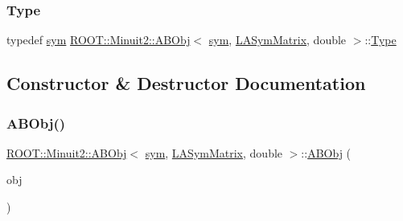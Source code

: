 \mbox{\label{classROOT_1_1Minuit2_1_1ABObj_3_01sym_00_01LASymMatrix_00_01double_01_4_ac7186d69c32b1e8a607ae45125e869c0}} 
\subsubsection{\texorpdfstring{Type}{Type}\hspace{0.1cm}{\footnotesize\ttfamily [2/2]}}
{\footnotesize\ttfamily typedef \mbox{\hyperlink{classROOT_1_1Minuit2_1_1sym}{sym}} \mbox{\hyperlink{classROOT_1_1Minuit2_1_1ABObj}{R\+O\+O\+T\+::\+Minuit2\+::\+A\+B\+Obj}}$<$ \mbox{\hyperlink{classROOT_1_1Minuit2_1_1sym}{sym}}, \mbox{\hyperlink{classROOT_1_1Minuit2_1_1LASymMatrix}{L\+A\+Sym\+Matrix}}, double $>$\+::\mbox{\hyperlink{classROOT_1_1Minuit2_1_1ABObj_3_01sym_00_01LASymMatrix_00_01double_01_4_ac7186d69c32b1e8a607ae45125e869c0}{Type}}}



\subsection{Constructor \& Destructor Documentation}
\mbox{\label{classROOT_1_1Minuit2_1_1ABObj_3_01sym_00_01LASymMatrix_00_01double_01_4_a22738586c6027ada2234556dbab7d406}} 
\subsubsection{\texorpdfstring{ABObj()}{ABObj()}\hspace{0.1cm}{\footnotesize\ttfamily [1/8]}}
{\footnotesize\ttfamily \mbox{\hyperlink{classROOT_1_1Minuit2_1_1ABObj}{R\+O\+O\+T\+::\+Minuit2\+::\+A\+B\+Obj}}$<$ \mbox{\hyperlink{classROOT_1_1Minuit2_1_1sym}{sym}}, \mbox{\hyperlink{classROOT_1_1Minuit2_1_1LASymMatrix}{L\+A\+Sym\+Matrix}}, double $>$\+::\mbox{\hyperlink{classROOT_1_1Minuit2_1_1ABObj}{A\+B\+Obj}} (\begin{DoxyParamCaption}\item[{const \mbox{\hyperlink{classROOT_1_1Minuit2_1_1LASymMatrix}{L\+A\+Sym\+Matrix}} \&}]{obj }\end{DoxyParamCaption})\hspace{0.3cm}{\ttfamily [inline]}}

